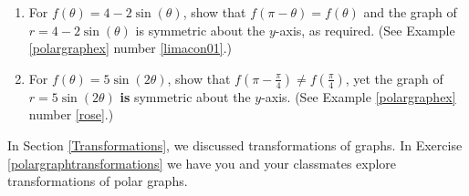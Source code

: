\documentclass{ximera}
\begin{document}
\begin{enumerate}
\begin{enumerate}

\item  For $f(\theta) = 4-2\sin(\theta)$, show that $f(\pi - \theta) = f(\theta)$ and the graph of $r = 4-2\sin(\theta)$ is symmetric about the $y$-axis, as required.  (See Example \ref{polargraphex} number \ref{limacon01}.)

\item  For $f(\theta) = 5\sin(2\theta)$, show that $f\left(\pi - \frac{\pi}{4} \right) \neq  f\left(  \frac{\pi}{4} \right)$,  yet the graph of $r = 5\sin(2\theta)$ \textbf{is} symmetric about the $y$-axis.  (See  Example \ref{polargraphex} number  \ref{rose}.)

\end{enumerate}

\setcounter{HW}{\value{enumi}}

\end{enumerate}

In Section \ref{Transformations}, we discussed transformations of graphs.   In Exercise \ref{polargraphtransformations} we have you and your classmates explore transformations of polar graphs. 
\end{document}
